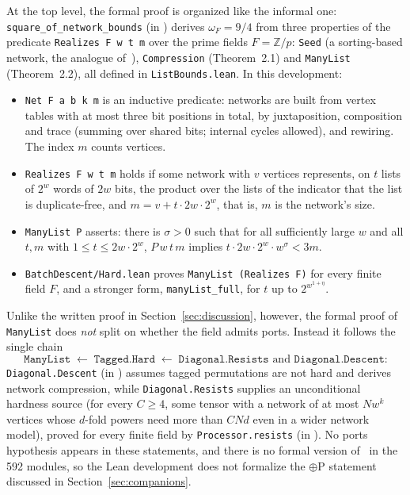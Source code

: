 \documentclass[11pt]{article}
\theoremstyle{definition}
\begin{document}
At the top level, the formal proof is organized like the informal one: \texttt{square\_of\_network\_bounds} (in ) derives $\omega_F = 9/4$ from three properties of the predicate \texttt{Realizes F w t m} over the prime fields $F=\mathbb{Z}/p$: \texttt{Seed} (a sorting-based network, the analogue of~\cite[Proposition~2.3]{OAI-MM}), \texttt{Compression} (Theorem~2.1) and \texttt{ManyList} (Theorem~2.2), all defined in \texttt{ListBounds.lean}. In this development:
\begin{itemize}
\item \texttt{Net F a b k m} is an inductive predicate: networks are built from vertex tables with at most three bit positions in total, by juxtaposition, composition and trace (summing over shared bits; internal cycles allowed), and rewiring. The index $m$ counts vertices.
\item \texttt{Realizes F w t m} holds if some network with $v$ vertices represents, on $t$ lists of $2^w$ words of $2w$ bits, the product over the lists of the indicator that the list is duplicate-free, and $m = v + t\cdot 2w\cdot 2^w$, that is, $m$ is the network's size.
\item \texttt{ManyList P} asserts: there is $\sigma>0$ such that for all sufficiently large $w$ and all $t,m$ with $1\le t\le 2w\cdot 2^w$, $P\,w\,t\,m$ implies $t\cdot 2w\cdot 2^w\cdot w^{\sigma} < 3m$.
\item \texttt{BatchDescent/Hard.lean} proves \texttt{ManyList (Realizes F)} for every finite field $F$, and a stronger form, \texttt{manyList\_full}, for $t$ up to $2^{w^{1+\eta}}$.
\end{itemize}
Unlike the written proof in Section~\ref{sec:discussion}, however, the formal proof of \texttt{ManyList} does \emph{not} split on whether the field admits ports. Instead it follows the single chain
\[
  \texttt{ManyList} \;\longleftarrow\; \texttt{Tagged.Hard} \;\longleftarrow\; \texttt{Diagonal.Resists} \text{ and } \texttt{Diagonal.Descent}\text{:}
\]
\texttt{Diagonal.Descent} (in ) assumes tagged permutations are not hard and derives network compression, while \texttt{Diagonal.Resists} supplies an unconditional hardness source (for every $C\ge 4$, some tensor with a network of at most $N w^k$ vertices whose $d$-fold powers need more than $C N d$ even in a wider network model), proved for every finite field by \texttt{Processor.resists} (in ). No ports hypothesis appears in these statements, and there is no formal version of~\cite[Theorem~12.1]{OAI-HC} in the 592 modules, so the Lean development does not formalize the $\oplus\mathrm{P}$ statement discussed in Section~\ref{sec:companions}.
\end{document}

